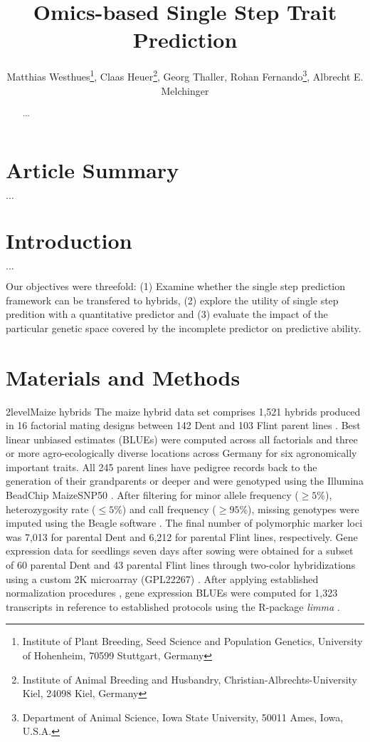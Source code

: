 \documentclass[12pt,titlepage]{article}
\title{Omics-based Single Step Trait Prediction}
\author{
  Matthias Westhues\thanks{Institute of Plant Breeding, Seed Science and Population Genetics, University of Hohenheim, 70599 Stuttgart, Germany},
  Claas Heuer\thanks{Institute of Animal Breeding and Husbandry, Christian-Albrechts-University Kiel, 24098 Kiel, Germany},
  Georg Thaller\samethanks[2],
  Rohan Fernando\thanks{Department of Animal Science, Iowa State University, 50011 Ames, Iowa, U.S.A.},
  Albrecht E. Melchinger\samethanks[1]
}
\begin{document}
\maketitle
\doublespacing
\linenumbers



\begin{abstract}

  $\dots$

\end{abstract}



\section{Article Summary}
$\dots$



\section{Introduction} 

$\dots$

Our objectives were threefold: (1) Examine whether the single step prediction
framework can be transfered to hybrids, (2) explore the utility of single step 
predition with a quantitative predictor and (3) evaluate the impact of the
particular genetic space covered by the incomplete predictor on predictive
ability.




\section{Materials and Methods}
\Genetics2level{Maize hybrids}
The maize hybrid data set comprises 1,521 hybrids produced in 16 factorial
mating designs between 142 Dent and 103 Flint parent lines \cite{Westhues2017}. 
Best linear unbiased estimates (BLUEs) were computed across all factorials and 
three or more agro-ecologically diverse locations across Germany for six 
agronomically important traits.
All 245 parent lines have pedigree records back to the generation of their 
grandparents or deeper \cite{Westhues2017} and were genotyped using the Illumina 
BeadChip MaizeSNP50 \cite{Ganal2011}.
After filtering for minor allele frequency ($\geq 5$\%), heterozygosity rate
($\leq 5$\%) and call frequency ($\geq 95$\%), missing genotypes were imputed 
using the Beagle software \cite{Browning2009}.
The final number of polymorphic marker loci was 7,013 for parental Dent and
6,212 for parental Flint lines, respectively.
Gene expression data for seedlings seven days after sowing were obtained for a 
subset of 60 parental Dent and 43 parental Flint lines through two-color
hybridizations using a custom 2K microarray (GPL22267) \cite{Westhues2017}.
After applying established normalization procedures 
\cite{Smyth2003,Ritchie2007}, gene expression BLUEs were computed for 1,323 
transcripts in reference to established protocols 
\cite{Smyth2003,Ritchie2007,Frisch2010} using the R-package \textit{limma}
\cite{Ritchie2015a}.
\end{document}
